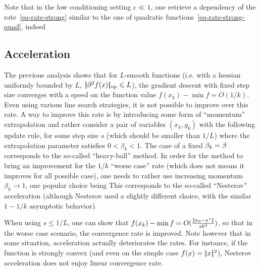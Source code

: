 Note that in the low conditioning setting $\epsilon \ll 1$, one retrieve a dependency of the rate~\eqref{eq-rate-strong} similar to the one of quadratic functions~\eqref{eq-rate-strong-quad}, indeed 


\subsection{Acceleration}

The previous analysis shows that for $L$-smooth functions (i.e. with a hessian uniformly bounded by $L$, $|\!| \partial^2 f(x) |\!|_{\text{op}} \leqslant L$), the gradient descent with fixed step size converges with a speed on the function value $f(x_k)-\min f = O(1/k)$. 
%
Even using various line search strategies, it is not possible to improve over this rate. 
%
A way to improve this rate is by introducing some form of ``momentum'' extrapolation and rather consider a pair of variables $(x_k,y_k)$ with the following update rule, for some step size $s$ (which should be smaller than $1/L$)
where the extrapolation parameter satisfies $0 < \beta_k < 1$. The case of a fixed $\beta_k=\beta$ corresponds to the so-called ``heavy-ball'' method. In order for the method to bring an improvement for the $1/k$ ``worse case'' rate (which does not means it improves for all possible case), one needs to rather use increasing momentum $\beta_k \rightarrow 1$, one popular choice being
This corresponds to the so-called ``Nesterov'' acceleration (although Nesterov used a slightly different choice, with the similar $1-1/k$ asymptotic behavior).

When using $s \leq 1/L$, one can show that $f(x_k)-\min f = O( \frac{|\!| x_0-x^\star |\!|}{s k^2} )$, so that in the worse case scenario, the convergence rate is improved. Note however that in some situation, acceleration actually deteriorates the rates. For instance, if the function is strongly convex (and even on the simple case $f(x)=|\!| x |\!|^2$), Nesterov acceleration does not enjoy linear convergence rate.

